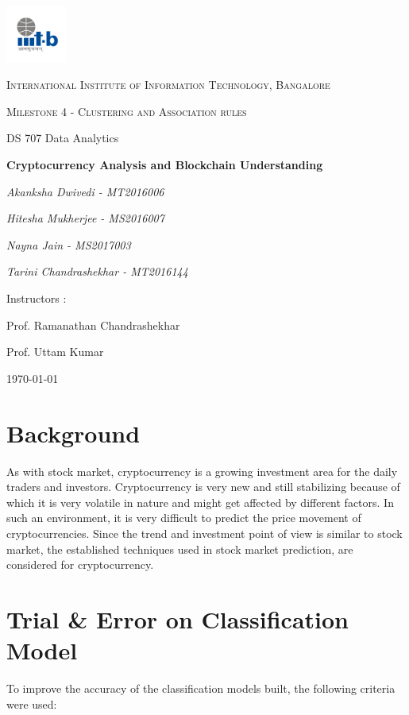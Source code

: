 \documentclass{article}
\begin{document}
\begin{titlepage}
	\centering
	\includegraphics[width=0.15\textwidth]{IIIT-B_logo.jpg}\par\vspace{1cm}
	{\scshape\LARGE International Institute of Information Technology, Bangalore \par}
	\vspace{1cm}
	{\scshape\Large Milestone 4 - Clustering and Association rules\par}
	{\Large  DS 707 Data Analytics\par}
	\vspace{1.5cm}
	{\huge\bfseries Cryptocurrency Analysis and Blockchain Understanding \par}
	\vspace{2cm}
	{\Large\itshape Akanksha Dwivedi - MT2016006\par}
	{\Large\itshape Hitesha Mukherjee - MS2016007\par}
	{\Large\itshape Nayna Jain - MS2017003\par}
	{\Large\itshape Tarini Chandrashekhar - MT2016144\par}
	\vfill
	Instructors : \par
	Prof. Ramanathan Chandrashekhar
	\par
	Prof. Uttam Kumar

	\vfill
	{\large \today\par}
\end{titlepage}
\tableofcontents
\justify
\newpage

\section{Background}
As with stock market, cryptocurrency is a growing investment area for the daily traders and investors. Cryptocurrency is very new and still stabilizing because of which it is very volatile in nature and might get affected by different factors. In such an environment, it is very difficult to predict the price movement of cryptocurrencies. Since the trend and investment point of view is similar to stock market, the established techniques used in stock market prediction, are considered
for cryptocurrency.

\section{Trial \& Error on Classification Model}
To improve the accuracy of the classification models built, the following criteria were used:
\end{document}

